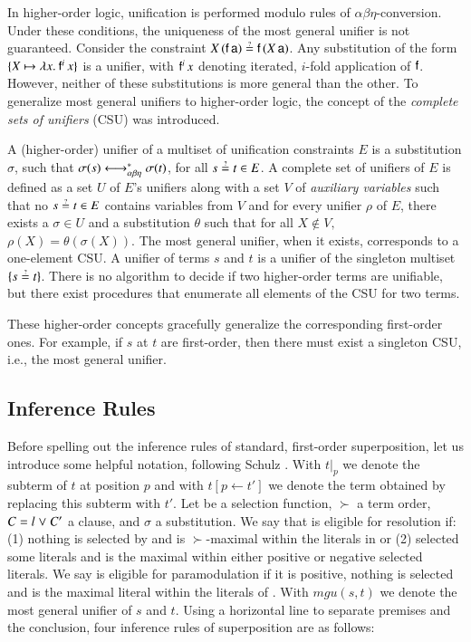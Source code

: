 In higher-order logic, unification is performed modulo rules of
$\alpha\beta\eta$-conversion. Under these conditions, the uniqueness of the most
general unifier is not guaranteed. Consider the constraint $X \,
(\cst{f} \, \cst{a}) \unif \cst{f} \, (X \, \cst{a})$. Any substitution of the
form $\{ X \mapsto \lambda x.\> \mathsf{f}^i \, x \}$ is a unifier, with $\mathsf{f}^i \, x$
denoting iterated, $i$-fold application of $\mathsf{f}$. However, neither of these substitutions
is more general than the other. To generalize most general
unifiers to higher-order logic, the concept of the {\em complete sets of unifiers} (CSU) was
introduced.

A (higher-order) unifier of a multiset of unification constraints $E$ is
a substitution $\sigma$, such that $\sigma(s) \longleftrightarrow^*_{\alpha\beta\eta} \sigma(t)$, for all $s \unif t
\in E$. A complete set of unifiers of $E$ is defined as a
set $U$ of $E$'s unifiers along with a set $V$ of \emph{auxiliary variables}
such that no $s \unif t \in E$ contains variables from $V$ and for every unifier
$\rho$ of $E$, there exists a $\sigma \in U$ and a substitution $\theta$ such
that for all $X\not\in V,$ $\rho(X) = \theta(\sigma(X))$. The most general unifier,
when it exists, corresponds to a one-element CSU. A unifier of terms $s$ and $t$ is a unifier of
the singleton multiset $\{ s \unif t \}$. There is no algorithm to decide
if two higher-order terms are unifiable, but there exist procedures
that enumerate all elements of the CSU for two terms.

These higher-order concepts gracefully generalize the corresponding first-order
ones. For example, if $s$ at $t$ are first-order, then there must exist a singleton
CSU, i.e., the most general unifier. 

\subsection{Inference Rules}
\label{sec:pre:rules}
\newcommand{\mgu}{\ensuremath{\mathit{mgu}}}

Before spelling out the inference rules of standard, first-order superposition,
let us introduce some helpful notation, following Schulz \cite{ss-02-brainiac}.
With $t|_p$ we denote the subterm of $t$ at position $p$ and with $t[p \leftarrow
t']$  we denote the term obtained by replacing this subterm with $t'$. Let \selfun{} be a selection function,
$\succ$ a term order, $C = l \mathrel\lor C'$ a clause, and $\sigma$ a
substitution. We say that  is eligible for resolution if: (1) nothing
is selected by \selfun{} and  is $\succ$-maximal within the literals in
 or (2) \selfun{} selected some literals and  is the maximal
within either positive or negative selected literals. We say  is
eligible for paramodulation if it is positive, nothing is selected and
 is the maximal literal within the literals of .  With
$\mgu(s,t)$ we denote the most general unifier of $s$ and $t$. Using a horizontal
line to separate premises and the conclusion, four inference rules of
superposition are as follows:

